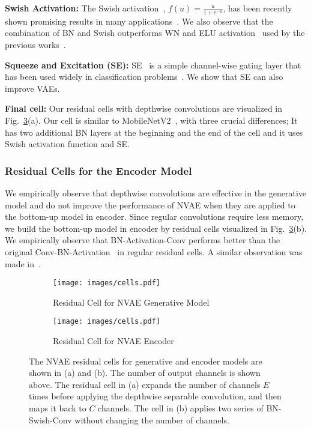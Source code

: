 \documentclass{article}
\begin{document}
\textbf{Swish Activation:} The Swish activation~\cite{ramachandran2017swish}, $f(u) = \frac{u}{1 + e^{-u}}$, has been recently shown promising results in many applications~\cite{tan2019efficientnet, chen2019residualflows}. We also observe that the combination of BN and Swish outperforms WN and ELU activation~\cite{clevert2015fast} used by the previous works~\cite{kingma2016improved, maaloe2019biva}.

\textbf{Squeeze and Excitation (SE):} SE~\cite{hu2017squeeze} is a simple channel-wise gating layer that has been used widely in classification problems~\cite{tan2019efficientnet}. We show that SE can also improve VAEs. 

\textbf{Final cell:} Our residual cells with depthwise convolutions are visualized in Fig.~\ref{fig:cells}(a). Our cell is similar to MobileNetV2~\cite{sandler2018mobilenetv2}, with three crucial differences; It has two additional BN layers at the beginning and the end of the cell and it uses Swish activation function and SE.

\subsubsection{Residual Cells for the Encoder Model}
We empirically observe that depthwise convolutions are effective in the generative model and do not improve the performance of NVAE when they are applied to the bottom-up model in encoder. Since regular convolutions require less memory, we build the bottom-up model in encoder by residual cells visualized in Fig.~\ref{fig:cells}(b). We empirically observe that BN-Activation-Conv performs better than the original Conv-BN-Activation~\cite{he2016deep} in regular residual cells. A similar observation was made in~\cite{he2016identity}.

\begin{figure}
\vspace{-1cm}
\centering
\begin{subfigure}[b]{.55\textwidth}
\centering
    \setlength{\belowcaptionskip}{0pt}
    \texttt{[image: images/cells.pdf]}
    \caption{Residual Cell for NVAE Generative Model}
    \label{fig:cell_dec}
\end{subfigure} \hspace{0.2cm}
\begin{subfigure}[b]{.4\textwidth}
\centering
    \setlength{\belowcaptionskip}{0pt}
    \texttt{[image: images/cells.pdf]}
    \caption{Residual Cell for NVAE Encoder}
    \label{fig:cell_enc}
\end{subfigure}
\caption{The NVAE residual cells for generative and encoder models are shown in (a) and (b). The number of output channels is shown above.  The residual cell in (a) expands the number of channels $E$ times before applying the depthwise separable convolution, and then maps it back to $C$ channels. The cell in (b) applies two series of BN-Swish-Conv without changing the number of channels.}
\label{fig:cells}
\vspace{-0.2cm}
\end{figure}
\end{document}
